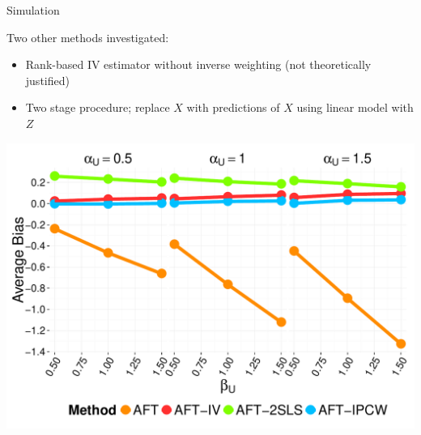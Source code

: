 \documentclass[final,plain]{beamer}
\newlength{\onecolwid}
\newlength{\halfcolwid}
\newlength{\twocolwid}
\newcommand{\bi}{\begin{itemize}}
\newcommand{\ei}{\end{itemize}}
\newcommand{\colonevsepsmall}{\vspace{8mm}}
\begin{document}
\begin{frame}[t]
\begin{columns}[t]
\begin{column}{\twocolwid}
\begin{columns}[t]
\begin{column}{\onecolwid}
\begin{block}{\Large Simulation}
{Two other methods investigated:

    \bi
    \item Rank-based IV estimator  without inverse weighting (not theoretically justified)
    \item Two stage procedure; replace $X$ with predictions of $X$ using linear model with $Z$
    \ei




    }




    \vspace{50pt}

	\centerline{\includegraphics[width=0.95\onecolwid]{Figs/beta_u_over_alpha_u.pdf}}


    \vspace{40pt}



\end{block}
\end{column}
\end{columns}
\end{column}
\end{columns}
\end{frame}
\end{document}
